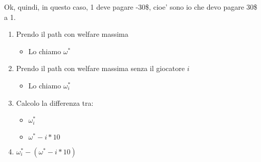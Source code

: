 Ok, quindi, in questo caso, 1 deve pagare -30\$, cioe' sono io che devo pagare 30\$ a 1.

\begin{enumerate}
    \item Prendo il path con welfare massima
    \begin{itemize}
        \item Lo chiamo $\omega^*$
    \end{itemize}
    \item Prendo il path con welfare massima senza il giocatore $i$
    \begin{itemize}
        \item Lo chiamo $\omega^*_i$
    \end{itemize}
    \item Calcolo la differenza tra:
    \begin{itemize}
        \item $\omega^*_i$
        \item $\omega^* - i*10$
    \end{itemize}
    \item $\omega^*_i - (\omega^* - i*10)$
\end{enumerate}

